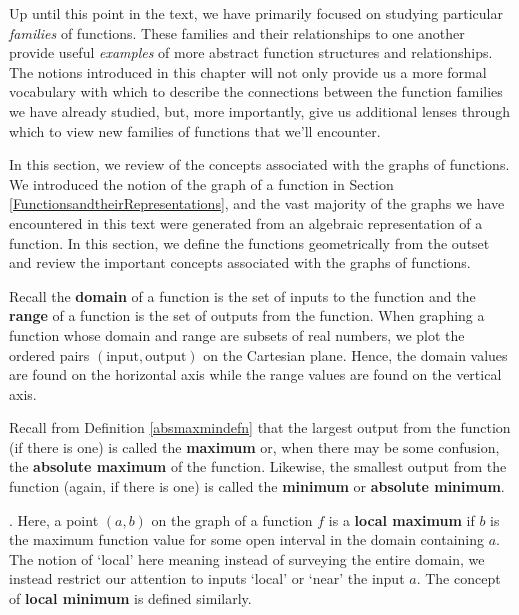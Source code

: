 

\setcounter{footnote}{0}

\label{GraphsofFunctions}

Up until this point in the text, we have primarily focused on studying particular \textit{families} of functions.  These families and their relationships to one another provide useful \textit{examples} of more abstract function structures and relationships.  The notions introduced in this chapter will not only provide us a more formal vocabulary with which to describe the connections between the function families we have already studied, but, more importantly,  give us additional lenses through which to  view  new families of functions that we'll encounter.

\smallskip


In this section, we review of the concepts associated with the graphs of functions.  We introduced the notion of the graph of a function  in Section \ref{FunctionsandtheirRepresentations}, and the vast majority of the graphs we have encountered in this text were generated from an algebraic representation of a function.  In this section, we define the functions geometrically from the outset and review the important concepts associated with the graphs of functions.

\smallskip

Recall the \textbf{domain} of a function is the set of inputs to the function and the \textbf{range} of a function is the set of outputs from the function.  When graphing a function whose domain and range are subsets of real numbers, we plot the ordered pairs $(\text{input}, \text{output})$ on the Cartesian plane.  Hence, the domain values are found on the horizontal axis while the range values are found on the vertical axis.

\smallskip

Recall from Definition \ref{absmaxmindefn} that the largest output from the function (if there is one) is called the \textbf{maximum} or, when there may be some confusion, the \textbf{absolute maximum} of the function.  Likewise, the smallest output from the function (again, if there is one) is called the \textbf{minimum} or \textbf{absolute minimum}.  

\smallskip

.  Here, a point $(a,b)$ on the graph of a function $f$ is a \textbf{local maximum} if $b$ is the maximum function value for some open interval in the domain containing $a$.  The notion of `local' here meaning instead of surveying the entire domain, we instead restrict our attention to inputs `local' or `near' the input $a$.  The concept of \textbf{local minimum} is defined similarly.

